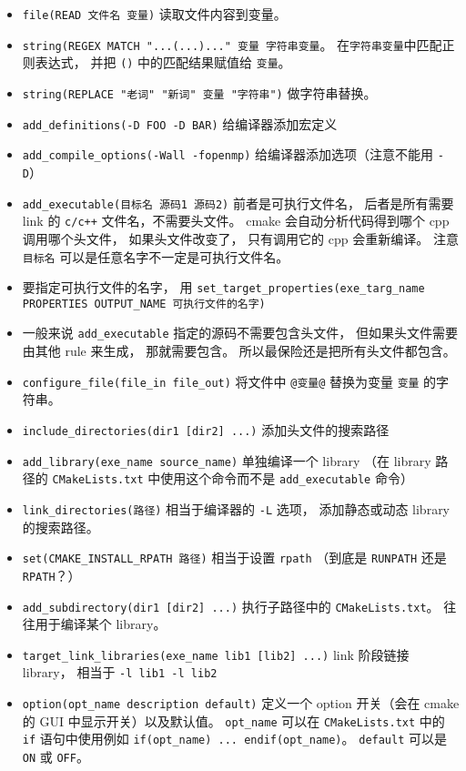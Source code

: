 \begin{itemize}
\item \verb|file(READ 文件名 变量)| 读取文件内容到变量。
\item \verb|string(REGEX MATCH "...(...)..." 变量 字符串变量|。 在\verb|字符串变量|中匹配正则表达式， 并把 \verb|()| 中的匹配结果赋值给 \verb|变量|。
\item \verb|string(REPLACE "老词" "新词" 变量 "字符串")| 做字符串替换。
\item \verb|add_definitions(-D FOO -D BAR)| 给编译器添加宏定义
\item \verb|add_compile_options(-Wall -fopenmp)| 给编译器添加选项（注意不能用 \verb|-D|）
\item \verb`add_executable(目标名 源码1 源码2)` 前者是可执行文件名， 后者是所有需要 link 的 \verb|c/c++| 文件名，不需要头文件。 cmake 会自动分析代码得到哪个 cpp 调用哪个头文件， 如果头文件改变了， 只有调用它的 cpp 会重新编译。 注意 \verb|目标名| 可以是任意名字不一定是可执行文件名。
\item 要指定可执行文件的名字， 用 \verb|set_target_properties(exe_targ_name PROPERTIES OUTPUT_NAME 可执行文件的名字)|
\item 一般来说 \verb|add_executable| 指定的源码不需要包含头文件， 但如果头文件需要由其他 rule 来生成， 那就需要包含。 所以最保险还是把所有头文件都包含。
\item \verb`configure_file(file_in file_out)` 将文件中 \verb`@变量@` 替换为变量 \verb`变量` 的字符串。
\item \verb`include_directories(dir1 [dir2] ...)` 添加头文件的搜索路径
\item \verb`add_library(exe_name source_name)` 单独编译一个 library （在 library 路径的 \verb|CMakeLists.txt| 中使用这个命令而不是 \verb`add_executable` 命令）
\item \verb|link_directories(路径)| 相当于编译器的 \verb`-L` 选项， 添加静态或动态 library 的搜索路径。
\item \verb|set(CMAKE_INSTALL_RPATH 路径)| 相当于设置 \verb|rpath| （到底是 \verb|RUNPATH| 还是 \verb|RPATH|？）
\item \verb`add_subdirectory(dir1 [dir2] ...)` 执行子路径中的 \verb|CMakeLists.txt|。 往往用于编译某个 library。
\item \verb`target_link_libraries(exe_name lib1 [lib2] ...)` link 阶段链接 library， 相当于 \verb|-l lib1 -l lib2|
\item \verb`option(opt_name description default)` 定义一个 option 开关（会在 cmake 的 GUI 中显示开关）以及默认值。 \verb`opt_name` 可以在 \verb|CMakeLists.txt| 中的 \verb`if` 语句中使用例如 \verb`if(opt_name) ... endif(opt_name)`。 \verb`default` 可以是 \verb`ON` 或 \verb`OFF`。

\end{itemize}
